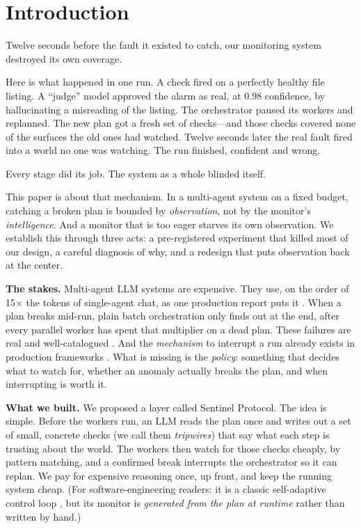 \documentclass[acmsmall,screen]{acmart}
\begin{document}

\maketitle

\section{Introduction}
Twelve seconds before the fault it existed to catch, our monitoring system
destroyed its own coverage.

Here is what happened in one run. A check fired on a perfectly healthy file
listing. A ``judge'' model approved the alarm as real, at 0.98 confidence, by
hallucinating a misreading of the listing. The orchestrator paused its workers
and replanned. The new plan got a fresh set of checks---and those checks
covered none of the surfaces the old ones had watched. Twelve seconds later the
real fault fired into a world no one was watching. The run finished, confident
and wrong.

Every stage did its job. The system as a whole blinded itself.

This paper is about that mechanism. In a multi-agent system on a fixed budget,
catching a broken plan is bounded by \emph{observation}, not by the monitor's
\emph{intelligence}. And a monitor that is too eager starves its own
observation. We establish this through three acts: a pre-registered experiment
that killed most of our design, a careful diagnosis of why, and a redesign that
puts observation back at the center.

\textbf{The stakes.} Multi-agent LLM systems are expensive. They use, on the
order of 15$\times$ the tokens of single-agent chat, as one production report
puts it \cite{ref27}. When a plan
breaks mid-run, plain batch orchestration only finds out at the end, after
every parallel worker has spent that multiplier on a dead plan. These failures
are real and well-catalogued \cite{ref14, ref16}. And the \emph{mechanism} to
interrupt a run already exists in production frameworks \cite{ref22}. What is
missing is the \emph{policy}: something that decides what to watch for, whether
an anomaly actually breaks the plan, and when interrupting is worth it.

\textbf{What we built.} We proposed a layer called Sentinel Protocol. The idea
is simple. Before the workers run, an LLM reads the plan once and writes out a
set of small, concrete checks (we call them \emph{tripwires}) that say what
each step is trusting about the world. The workers then watch for those checks
cheaply, by pattern matching, and a confirmed break interrupts the orchestrator
so it can replan. We pay for expensive reasoning once, up front, and keep the
running system cheap. (For software-engineering readers: it is a classic
self-adaptive control loop \cite{ref23}, but its monitor is \emph{generated
from the plan at runtime} rather than written by hand.)
\end{document}
